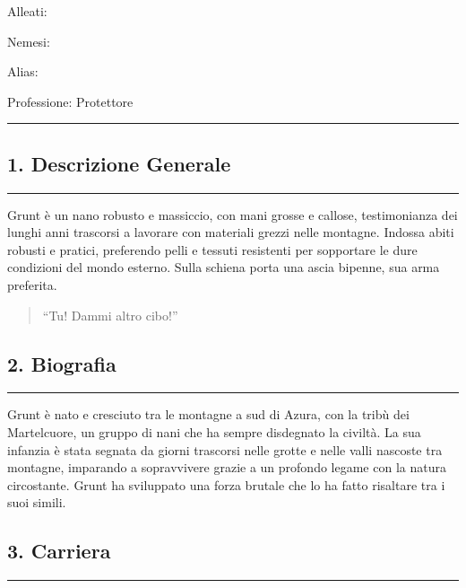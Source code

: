 Alleati:

Nemesi:

Alias:

Professione: Protettore

\begin{center}\rule{0.5\linewidth}{0.5pt}\end{center}

\subsection{1. Descrizione Generale}\label{descrizione-generale}

\begin{center}\rule{0.5\linewidth}{0.5pt}\end{center}

Grunt è un nano robusto e massiccio, con mani grosse e callose,
testimonianza dei lunghi anni trascorsi a lavorare con materiali grezzi
nelle montagne. Indossa abiti robusti e pratici, preferendo pelli e
tessuti resistenti per sopportare le dure condizioni del mondo esterno.
Sulla schiena porta una ascia bipenne, sua arma preferita.

\begin{quote}
``Tu! Dammi altro cibo!''
\end{quote}

\subsection{2. Biografia}\label{biografia}

\begin{center}\rule{0.5\linewidth}{0.5pt}\end{center}

Grunt è nato e cresciuto tra le montagne a sud di Azura, con la tribù
dei Martelcuore, un gruppo di nani che ha sempre disdegnato la civiltà.
La sua infanzia è stata segnata da giorni trascorsi nelle grotte e nelle
valli nascoste tra montagne, imparando a sopravvivere grazie a un
profondo legame con la natura circostante. Grunt ha sviluppato una forza
brutale che lo ha fatto risaltare tra i suoi simili.

\subsection{3. Carriera}\label{carriera}

\begin{center}\rule{0.5\linewidth}{0.5pt}\end{center}

